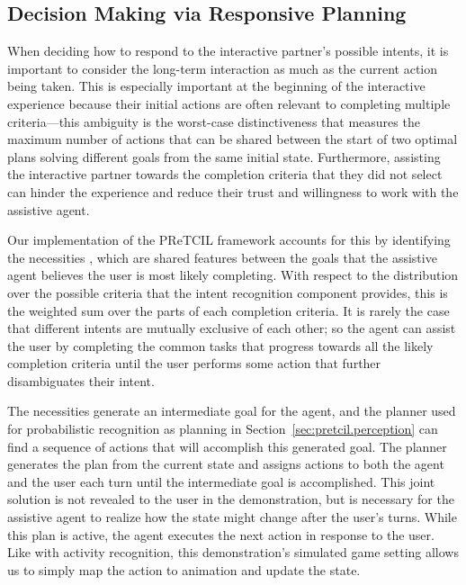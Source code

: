 \documentclass[letterpaper]{article} %
\begin{document}
\subsection{Decision Making via Responsive Planning\label{sec:pretcil.dec_making}}
When deciding how to respond to the interactive partner's possible intents, it is important to consider the long-term interaction as much as the current action being taken.  This is especially important at the beginning of the interactive experience because their initial actions are often relevant to completing multiple criteria---this ambiguity is the worst-case distinctiveness \cite{keren_ICAPS147814} that measures the maximum number of actions that can be shared between the start of two optimal plans solving different goals from the same initial state.
Furthermore, assisting the interactive partner towards the completion criteria that they did not select can hinder the experience and reduce their trust and willingness to work with the assistive agent.

Our implementation of the {\sc PReTCIL} framework accounts for this by identifying the necessities \cite{fz_aaai2017}, which are shared features between the goals that the assistive agent believes the user is most likely completing.  With respect to the distribution over the possible criteria that the intent recognition component provides, this is the weighted sum over the parts of each completion criteria.  It is rarely the case that different intents are mutually exclusive of each other; so the agent can assist the user by completing the common tasks that progress towards all the likely completion criteria until the user performs some action that further disambiguates their intent.

The necessities generate an intermediate goal for the agent, and the planner used for probabilistic recognition as planning in Section~\ref{sec:pretcil.perception} can find a sequence of actions that will accomplish this generated goal.  The planner generates the plan from the current state and assigns actions to both the agent and the user each turn until the intermediate goal is accomplished.  This joint solution is not revealed to the user in the demonstration, but is necessary for the assistive agent to realize how the state might change after the user's turns.  While this plan is active, the agent executes the next action in response to the user.  Like with activity recognition, this demonstration's simulated game setting allows us to simply map the action to animation and update the state.
\end{document}

